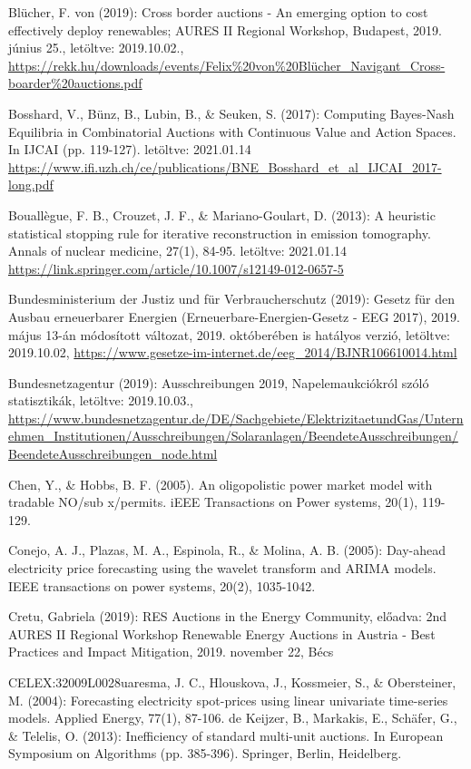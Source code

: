 \documentclass[twoside, magyar, showtrims]{corvinusphd}
\begin{document}
\begin{thebibliography}{99}
Blücher, F. von (2019): Cross border auctions - An emerging option to cost effectively deploy renewables; AURES II Regional Workshop, Budapest, 2019. június 25., letöltve: 2019.10.02., 
\url{https://rekk.hu/downloads/events/Felix\%20von\%20Blücher\_Navigant\_Cross-boarder\%20auctions.pdf}

Bosshard, V., Bünz, B., Lubin, B., \& Seuken, S. (2017): Computing Bayes-Nash Equilibria in Combinatorial Auctions with Continuous Value and Action Spaces. In IJCAI (pp. 119-127).
letöltve: 2021.01.14
\url{https://www.ifi.uzh.ch/ce/publications/BNE\_Bosshard\_et\_al\_IJCAI\_2017-long.pdf}

Bouallègue, F. B., Crouzet, J. F., \& Mariano-Goulart, D. (2013): A heuristic statistical stopping rule for iterative reconstruction in emission tomography. Annals of nuclear medicine, 27(1), 84-95.
letöltve: 2021.01.14
\url{https://link.springer.com/article/10.1007/s12149-012-0657-5}

Bundesministerium der Justiz und für Verbraucherschutz (2019): Gesetz für den Ausbau erneuerbarer Energien (Erneuerbare-Energien-Gesetz - EEG 2017), 2019. május 13-án módosított változat, 2019. októberében is hatályos verzió, letöltve: 2019.10.02, 
\url{https://www.gesetze-im-internet.de/eeg\_2014/BJNR106610014.html}

Bundesnetzagentur (2019): Ausschreibungen 2019, Napelemaukciókról szóló statisztikák, letöltve: 2019.10.03., 
\url{https://www.bundesnetzagentur.de/DE/Sachgebiete/ElektrizitaetundGas/Unternehmen\_Institutionen/Ausschreibungen/Solaranlagen/BeendeteAusschreibungen/BeendeteAusschreibungen\_node.html}

Chen, Y., \& Hobbs, B. F. (2005). An oligopolistic power market model with tradable NO/sub x/permits. iEEE Transactions on Power systems, 20(1), 119-129.

Conejo, A. J., Plazas, M. A., Espinola, R., \& Molina, A. B. (2005): Day-ahead electricity price forecasting using the wavelet transform and ARIMA models. IEEE transactions on power systems, 20(2), 1035-1042.

Cretu, Gabriela (2019): RES Auctions in the Energy Community, előadva: 2nd AURES II Regional Workshop Renewable Energy Auctions in Austria - Best Practices and Impact Mitigation, 2019. november 22, Bécs

CELEX:32009L0028uaresma, J. C., Hlouskova, J., Kossmeier, S., \& Obersteiner, M. (2004): Forecasting electricity spot-prices using linear univariate time-series models. Applied Energy, 77(1), 87-106.
de Keijzer, B., Markakis, E., Schäfer, G., \& Telelis, O. (2013): Inefficiency of standard multi-unit auctions. In European Symposium on Algorithms (pp. 385-396). Springer, Berlin, Heidelberg.


\end{thebibliography}
\end{document}
